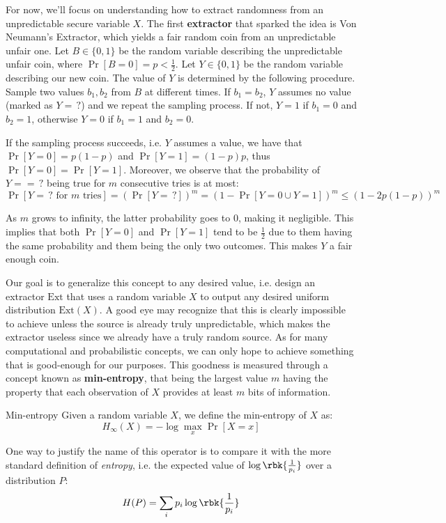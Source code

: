 \documentclass[a4paper, 12pt]{report}
\begin{document}
    For now, we'll focus on understanding how to extract randomness from an unpredictable secure variable $X$. The first \textbf{extractor} that sparked the idea is Von Neumann's Extractor, which yields a fair random coin from an unpredictable unfair one. Let $B \in \{0,1\}$ be the random variable describing the unpredictable unfair coin, where $\Pr[B = 0] = p < \frac{1}{2}$. Let $Y \in \{0,1\}$ be the random variable describing our new coin. The value of $Y$ is determined by the following procedure. Sample two values $b_1, b_2$ from $B$ at different times. If $b_1 = b_2$, $Y$ assumes no value (marked as $Y = \,?$) and we repeat the sampling process. If not, $Y = 1$ if $b_1 = 0$ and $b_2 = 1$, otherwise $Y = 0$ if $b_1 = 1$ and $b_2 = 0$.

    If the sampling process succeeds, i.e. $Y$ assumes a value, we have that $\Pr[Y = 0] = p(1-p)$ and $\Pr[Y = 1] = (1-p)p$, thus $\Pr[Y = 0] = \Pr[Y = 1]$. Moreover, we observe that the probability of $Y= = \, ?$ being true for $m$ consecutive tries is at most:
    \[\Pr[Y = \,? \text{ for $m$ tries}] = (\Pr[Y= \, ?])^m = (1-\Pr[Y = 0 \cup Y = 1])^m \leq (1-2p(1-p))^m\] 

    As $m$ grows to infinity, the latter probability goes to 0, making it negligible. This implies that both $\Pr[Y=0]$ and $\Pr[Y = 1]$ tend to be $\frac{1}{2}$ due to them having the same probability and them being the only two outcomes. This makes $Y$ a fair enough coin.

    Our goal is to generalize this concept to any desired value, i.e. design an extractor $\mathrm{Ext}$ that uses a random variable $X$ to output any desired uniform distribution $\mathrm{Ext}(X)$. A good eye may recognize that this is clearly impossible to achieve unless the source is already truly unpredictable, which makes the extractor useless since we already have a truly random source. As for many computational and probabilistic concepts, we can only hope to achieve something that is good-enough for our purposes. This goodness is measured through a concept known as \textbf{min-entropy}, that being the largest value $m$ having the property that each observation of $X$ provides at least $m$ bits of information.

    \begin{frameddefn}{Min-entropy}
        Given a random variable $X$, we define the min-entropy of $X$ as:
        \[H_{\infty}(X) = - \log \max_{x} \Pr[X = x]\]
    \end{frameddefn}

    One way to justify the name of this operator is to compare it with the more standard definition of \textit{entropy}, i.e. the expected value of $\log\rbk{\frac{1}{p_i}}$ over a distribution $P$:
    \[H(P) = \sum_{i} p_i \log\rbk{\frac{1}{p_i}}\]
\end{document}
